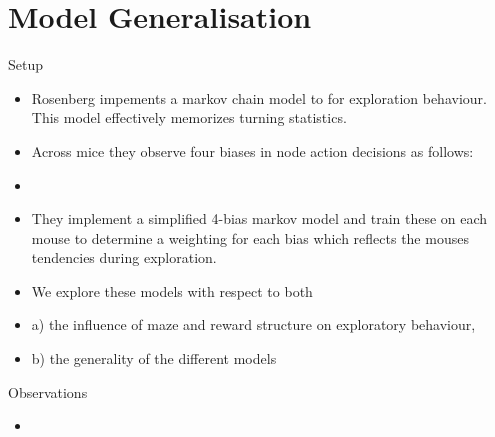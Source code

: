 \section{Model Generalisation}

Setup
\begin{itemize}
    \item Rosenberg impements a markov chain model to for exploration behaviour. This model effectively memorizes turning statistics. 
    \item Across mice they observe four biases in node action decisions as follows:
    \item <insert description of biases>
    \item They implement a simplified 4-bias markov model and train these on each mouse to determine a weighting for each bias which reflects the mouses tendencies during exploration.
    \item We explore these models with respect to both
    \item a) the influence of maze and reward structure on exploratory behaviour,
    \item b) the generality of the different models
\end{itemize}

Observations
\begin{itemize}
    \item 
\end{itemize}

